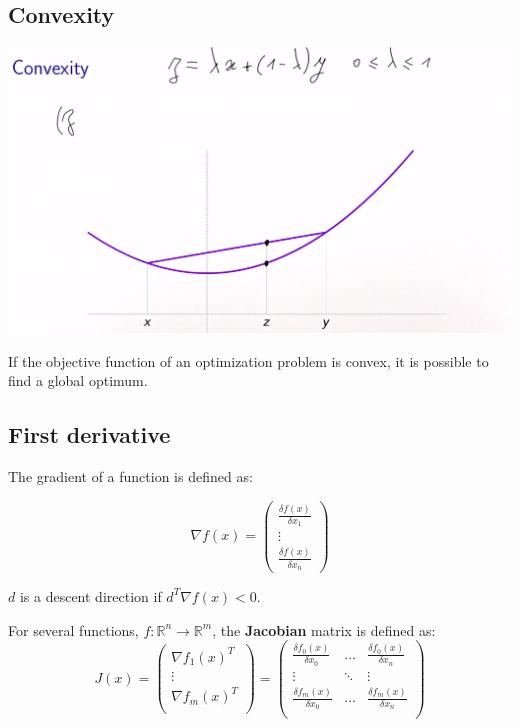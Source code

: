 \subsection{Convexity}


\includegraphics[width=\linewidth]{content/convexity.png}

If the objective function of an optimization problem is convex, it is possible to find a global optimum.

\subsection{First derivative}
The gradient of a function is defined as:

\begin{equation}
    \nabla f(x)=\left(\begin{array}{c}
        \frac{\delta f(x)}{\delta x_1} \\
        \vdots \\
        \frac{\delta f(x)}{\delta x_n}
    \end{array}\right)
\end{equation}

$d$ is a descent direction if $d^T\nabla f(x) < 0$.

For several functions, $f: \mathbb{R}^n\rightarrow\mathbb{R}^m$, the \textbf{Jacobian} matrix is defined as:
\begin{equation}
    J(x) = \left(\begin{array}{c}
        \nabla f_1(x)^T \\
        \vdots  \\
        \nabla f_m(x)^T \\
    \end{array}\right) = \left(\begin{array}{ccc}
        \frac{\delta f_0(x)}{\delta x_0} & \dots & \frac{\delta f_0(x)}{\delta x_n} \\
         \vdots & \ddots & \vdots \\
        \frac{\delta f_m(x)}{\delta x_0} & \dots & \frac{\delta f_m(x)}{\delta x_n} \\
    \end{array}\right)
\end{equation}

